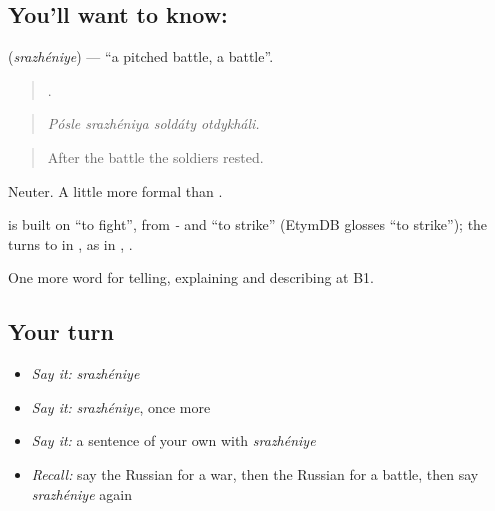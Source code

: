 \subsection*{You'll want to know: }
\textbf{} (\emph{srazhéniye}) — \textquotedblleft{}a pitched battle, a battle\textquotedblright{}.

\begin{quote}
   .
\end{quote}

\begin{quote}
\emph{Pósle srazhéniya soldáty otdykháli.}
\end{quote}

\begin{quote}
After the battle the soldiers rested.
\end{quote}

Neuter. A little more formal than \emph{}.

\begin{cousinweb}
\emph{} is built on \emph{} \textquotedblleft{}to fight\textquotedblright{}, from \emph{-} and \emph{} \textquotedblleft{}to strike\textquotedblright{} (EtymDB glosses \emph{} \textquotedblleft{}to strike\textquotedblright{}); the \emph{} turns to \emph{} in \emph{}, as in \emph{}, \emph{}.
\end{cousinweb}

\begin{grammarlens}[title={What you've built}]
One more word for telling, explaining and describing at B1.
\end{grammarlens}

\subsection*{Your turn}
\begin{itemize}
\raggedright
  \item \emph{Say it:} \emph{srazhéniye}
  \item \emph{Say it:} \emph{srazhéniye}, once more
  \item \emph{Say it:} a sentence of your own with \emph{srazhéniye}
  \item \emph{Recall:} say the Russian for a war, then the Russian for a battle, then say \emph{srazhéniye} again
\end{itemize}

